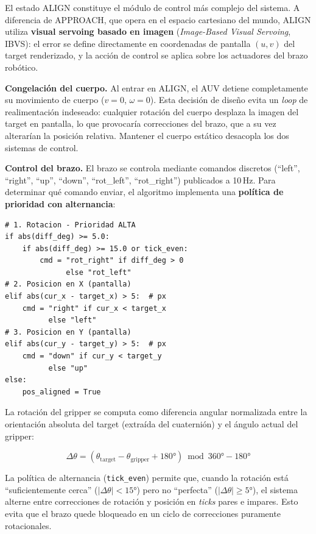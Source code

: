 \documentclass[10pt,twocolumn,letterpaper]{article}
\begin{document}
El estado ALIGN constituye el módulo de control más complejo del sistema. A diferencia de APPROACH, que opera en el espacio cartesiano del mundo, ALIGN utiliza \textbf{visual servoing basado en imagen} (\textit{Image-Based Visual Servoing}, IBVS): el error se define directamente en coordenadas de pantalla $(u, v)$ del target renderizado, y la acción de control se aplica sobre los actuadores del brazo robótico.

\textbf{Congelación del cuerpo.} Al entrar en ALIGN, el AUV detiene completamente su movimiento de cuerpo ($v = 0$, $\omega = 0$). Esta decisión de diseño evita un \textit{loop} de realimentación indeseado: cualquier rotación del cuerpo desplaza la imagen del target en pantalla, lo que provocaría correcciones del brazo, que a su vez alterarían la posición relativa. Mantener el cuerpo estático desacopla los dos sistemas de control.

\textbf{Control del brazo.} El brazo se controla mediante comandos discretos (``left'', ``right'', ``up'', ``down'', ``rot\_left'', ``rot\_right'') publicados a 10\,Hz. Para determinar qué comando enviar, el algoritmo implementa una \textbf{política de prioridad con alternancia}:

\begin{lstlisting}[caption={Bucle de visual servoing del estado ALIGN.}, label={lst:align}]
# 1. Rotacion - Prioridad ALTA
if abs(diff_deg) >= 5.0:
    if abs(diff_deg) >= 15.0 or tick_even:
        cmd = "rot_right" if diff_deg > 0
              else "rot_left"
# 2. Posicion en X (pantalla)
elif abs(cur_x - target_x) > 5:  # px
    cmd = "right" if cur_x < target_x
          else "left"
# 3. Posicion en Y (pantalla)
elif abs(cur_y - target_y) > 5:  # px
    cmd = "down" if cur_y < target_y
          else "up"
else:
    pos_aligned = True
\end{lstlisting}

La rotación del gripper se computa como diferencia angular normalizada entre la orientación absoluta del target (extraída del cuaternión) y el ángulo actual del gripper:

\begin{equation}
\Delta\theta = \left(\theta_{\text{target}} - \theta_{\text{gripper}} + 180°\right) \bmod 360° - 180°
\label{eq:gripper_rotation}
\end{equation}

La política de alternancia (\texttt{tick\_even}) permite que, cuando la rotación está ``suficientemente cerca'' ($|\Delta\theta| < 15°$) pero no ``perfecta'' ($|\Delta\theta| \geq 5°$), el sistema alterne entre correcciones de rotación y posición en \textit{ticks} pares e impares. Esto evita que el brazo quede bloqueado en un ciclo de correcciones puramente rotacionales.
\end{document}
